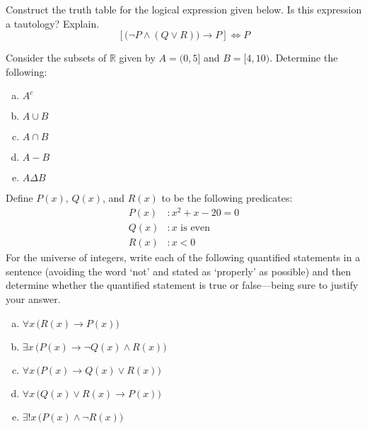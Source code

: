 \documentclass[12pt,letterpaper]{exam}
\begin{document}
\examtitle
{} 
\scores
\bottomline
\newpage

\begin{questions}

\newpage
\question[10] Construct the truth table for the logical expression given below. Is this expression a tautology? Explain. 
	\[
	\left[ \big( \neg P \wedge (Q \vee R) \big) \to P \right] \Longleftrightarrow P
	\]



\newpage
\question[10] Consider the subsets of $\mathbb{R}$ given by $A= (0, 5]$ and $B= [4, 10)$. Determine the following:
	\begin{enumerate}[(a)]
	\item $A^c$
	\item $A \cup B$
	\item $A \cap B$
	\item $A - B$
	\item $A \Delta B$
	\end{enumerate}



\newpage
\question[10] Define $P(x)$, $Q(x)$, and $R(x)$ to be the following predicates:
	\[
	\begin{aligned}
	P(x)&: x^2 + x - 20= 0 \\
	Q(x)&: x \text{ is even} \\
	R(x)&: x < 0
	\end{aligned}
	\]
For the universe of integers, write each of the following quantified statements in a sentence (avoiding the word `not' and stated as `properly' as possible) and then determine whether the quantified statement is true or false---being sure to justify your answer.
	\begin{enumerate}[(a)]
	\item $\forall x\, \big( R(x) \to P(x) \big)$
	\item $\exists x\, \big( P(x) \to \neg Q(x) \wedge R(x) \big)$
	\item $\forall x\, \big( P(x) \to Q(x) \vee R(x) \big)$
	\item $\forall x\, \big( Q(x) \vee R(x) \to P(x) \big)$
	\item $\exists! x\, \big( P(x) \wedge \neg R(x) \big)$
	\end{enumerate}




\end{questions}
\end{document}
